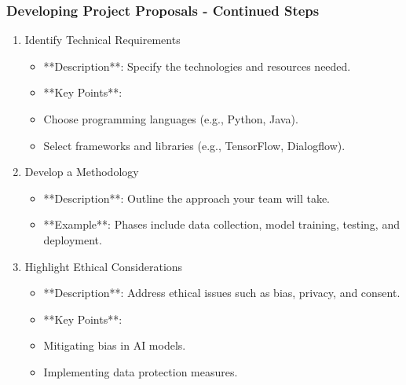 \documentclass[aspectratio=169]{beamer}
\begin{document}
\begin{frame}[fragile]
    \frametitle{Developing Project Proposals - Continued Steps}
    \begin{enumerate}[resume]
        \item Identify Technical Requirements
        \begin{itemize}
            \item **Description**: Specify the technologies and resources needed.
            \item **Key Points**:
                \item Choose programming languages (e.g., Python, Java).
                \item Select frameworks and libraries (e.g., TensorFlow, Dialogflow).
        \end{itemize}
        
        \item Develop a Methodology
        \begin{itemize}
            \item **Description**: Outline the approach your team will take.
            \item **Example**: Phases include data collection, model training, testing, and deployment.
        \end{itemize}
        
        \item Highlight Ethical Considerations
        \begin{itemize}
            \item **Description**: Address ethical issues such as bias, privacy, and consent.
            \item **Key Points**:
                \item Mitigating bias in AI models.
                \item Implementing data protection measures.
        \end{itemize}
    \end{enumerate}
\end{frame}
\end{document}
